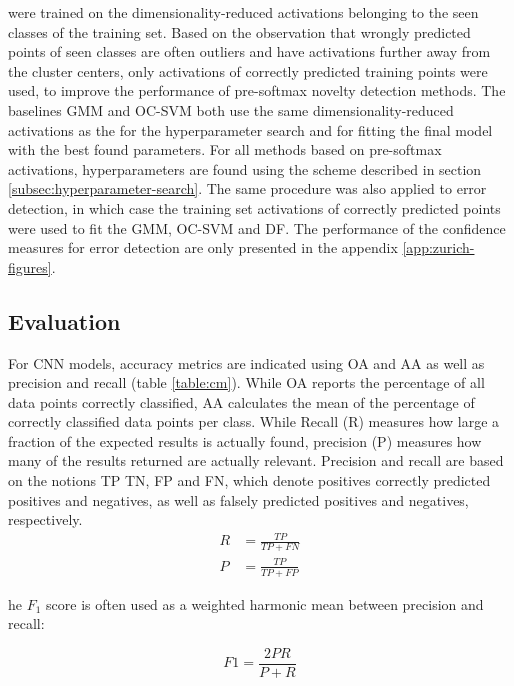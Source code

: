 \documentclass[10pt]{article}
\begin{document}
 were trained on the dimensionality-reduced activations belonging to the seen classes of the training set. Based on the observation that wrongly predicted points of seen classes are often outliers and have activations further away from the cluster centers, only activations of correctly predicted training points were used, to improve the performance of pre-softmax novelty detection methods. The baselines \gls{GMM} and \gls{OC-SVM} both use the same dimensionality-reduced activations as the  for the hyperparameter search and for fitting the final model with the best found parameters. For all methods based on pre-softmax activations, hyperparameters are found using the scheme described in section \ref{subsec:hyperparameter-search}. The same procedure was also applied to error detection, in which case the training set activations of correctly predicted points were used to fit the \gls{GMM}, \gls{OC-SVM} and \acrlong{DF}. The performance of the confidence measures for error detection are only presented in the appendix \ref{app:zurich-figures}.

\subsection{Evaluation}
For \gls{CNN} models, accuracy metrics are indicated using \gls{OA} and \gls{AA} as well as precision and recall (table \ref{table:cm}). While \gls{OA} reports the percentage of all data points correctly classified, \gls{AA} calculates the mean of the percentage of correctly classified data points per class. While Recall (R) measures how large a fraction of the expected results is actually found, precision (P) measures how many of the results returned are actually relevant. Precision and recall are based on the notions \gls{TP} \gls{TN}, \gls{FP} and \gls{FN}, which denote positives correctly predicted positives and negatives, as well as falsely predicted positives and negatives, respectively.
\begin{equation}
\begin{aligned}
	R&=\frac{TP}{TP+FN}\\
	P&=\frac{TP}{TP+FP}
\end{aligned}
\end{equation}

he $F_1$ score is often used as a weighted harmonic mean between precision and recall:

 \begin{equation}
F1=\frac{2PR}{P+R}
\end{equation}
\end{document}

